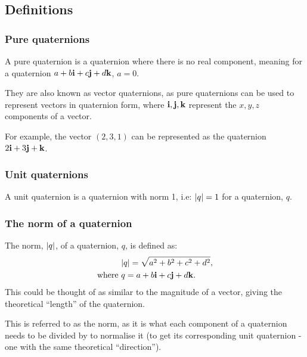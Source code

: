 \documentclass[12pt]{article}
\theoremstyle{definition}
\begin{document}
\subsection{Definitions}

\subsubsection{Pure quaternions}

A pure quaternion is a quaternion where there is no real component, meaning for a quaternion $a + b\vb{i} + c\vb{j} + d\vb{k}$, $a = 0$. \cite{Math431}

They are also known as vector quaternions, as pure quaternions can be used to represent vectors in quaternion form, where $\vb{i, j, k}$ represent the $x, y, z$ components of a vector.

For example, the vector $(2,3,1)$ can be represented as the quaternion $2\vb{i} + 3\vb{j} + \vb{k}$.

\subsubsection{Unit quaternions}

A unit quaternion is a quaternion with norm 1, i.e: $\abs{q} = 1$ for a quaternion, $q$. \cite{DRose}

\subsubsection{The norm of a quaternion}

The norm, $\abs{q}$, of a quaternion, $q$, is defined as:
\begin{equation}
    \begin{aligned}
        &\abs{q} = \sqrt{a^2 + b^2 + c^2 + d^2}, \\
        \text{where } & q = a + b\vb{i} + c\vb{j} + d\vb{k}.
    \end{aligned} 
\end{equation}
This could be thought of as similar to the magnitude of a vector, giving the theoretical ``length'' of the quaternion. \cite{Math431}

This is referred to as the norm, as it is what each component of a quaternion needs to be divided by to normalise it (to get its corresponding unit quaternion - one with the same theoretical ``direction'').
\end{document}
